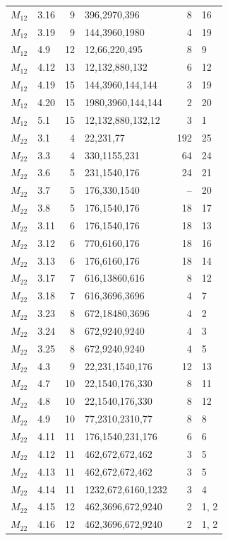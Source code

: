 \begin{longtable}{@{}llrlrl@{}}
$M_{12}$ & 3.16 & 9 & 396,2970,396 & 8 & 16 \\
$M_{12}$ & 3.19 & 9 & 144,3960,1980 & 4 & 19 \\
$M_{12}$ & 4.9 & 12 & 12,66,220,495 & 8 & 9 \\
$M_{12}$ & 4.12 & 13 & 12,132,880,132 & 6 & 12 \\
$M_{12}$ & 4.19 & 15 & 144,3960,144,144 & 3 & 19 \\
$M_{12}$ & 4.20 & 15 & 1980,3960,144,144 & 2 & 20 \\
$M_{12}$ & 5.1 & 15 & 12,132,880,132,12 & 3 & 1 \\
$M_{22}$ & 3.1 & 4 & 22,231,77 & 192 & 25 \\
$M_{22}$ & 3.3 & 4 & 330,1155,231 & 64 & 24 \\
$M_{22}$ & 3.6 & 5 & 231,1540,176 & 24 & 21 \\
$M_{22}$ & 3.7 & 5 & 176,330,1540 & -- & 20 \\
$M_{22}$ & 3.8 & 5 & 176,1540,176 & 18 & 17 \\
$M_{22}$ & 3.11 & 6 & 176,1540,176 & 18 & 13 \\
$M_{22}$ & 3.12 & 6 & 770,6160,176 & 18 & 16 \\
$M_{22}$ & 3.13 & 6 & 176,6160,176 & 18 & 14 \\
$M_{22}$ & 3.17 & 7 & 616,13860,616 & 8 & 12 \\
$M_{22}$ & 3.18 & 7 & 616,3696,3696 & 4 & 7 \\
$M_{22}$ & 3.23 & 8 & 672,18480,3696 & 4 & 2 \\
$M_{22}$ & 3.24 & 8 & 672,9240,9240 & 4 & 3 \\
$M_{22}$ & 3.25 & 8 & 672,9240,9240 & 4 & 5 \\
$M_{22}$ & 4.3 & 9 & 22,231,1540,176 & 12 & 13 \\
$M_{22}$ & 4.7 & 10 & 22,1540,176,330 & 8 & 11 \\
$M_{22}$ & 4.8 & 10 & 22,1540,176,330 & 8 & 12 \\
$M_{22}$ & 4.9 & 10 & 77,2310,2310,77 & 8 & 8 \\
$M_{22}$ & 4.11 & 11 & 176,1540,231,176 & 6 & 6 \\
$M_{22}$ & 4.12 & 11 & 462,672,672,462 & 3 & 5 \\
$M_{22}$ & 4.13 & 11 & 462,672,672,462 & 3 & 5 \\
$M_{22}$ & 4.14 & 11 & 1232,672,6160,1232 & 3 & 4 \\
$M_{22}$ & 4.15 & 12 & 462,3696,672,9240 & 2 & 1, 2 \\
$M_{22}$ & 4.16 & 12 & 462,3696,672,9240 & 2 & 1, 2 \\

\end{longtable}

